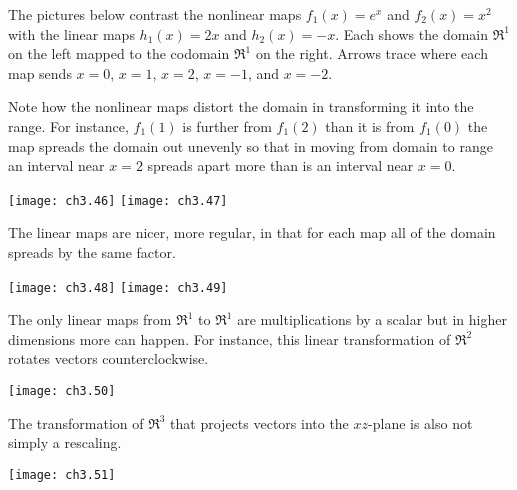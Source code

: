 The pictures below contrast the nonlinear maps
\( f_1(x)=e^x \) and \( f_2(x)=x^2 \) with the linear maps
\( h_1(x)=2x \) and \( h_2(x)=-x \).
Each shows the domain $\Re^1$ on the left 
mapped to the codomain $\Re^1$ on the right. 
Arrows trace where each map sends
$x=0$, $x=1$, $x=2$, $x=-1$, and $x=-2$.

Note how the nonlinear maps distort
the domain in transforming it into the range.
For instance,
\( f_1(1) \) is further from
$f_1(2)$ than it is from $f_1(0)$ \Dash  the map spreads
the domain out unevenly so that in moving from domain to range  
an interval near $x=2$ spreads apart more 
than is an interval near $x=0$.
\begin{center}
  \texttt{[image: ch3.46]}
  \hspace*{3em}
  \texttt{[image: ch3.47]}
\end{center}
The linear maps are nicer, more regular, 
in that for each map all of the domain 
spreads by the same factor.
\begin{center}
  \texttt{[image: ch3.48]}
  \hspace*{3em}
  \texttt{[image: ch3.49]}
\end{center}

The only linear maps from $\Re^1$ to $\Re^1$ are multiplications by a scalar but
in higher dimensions more can happen. 
For instance, this linear transformation of $\Re^2$
rotates vectors counterclockwise.
\begin{center}
  \texttt{[image: ch3.50]}
\end{center}
The transformation of $\Re^3$ 
that projects vectors into the $xz$-plane
is also not simply a rescaling.
\begin{center}
 \texttt{[image: ch3.51]}
\end{center}

